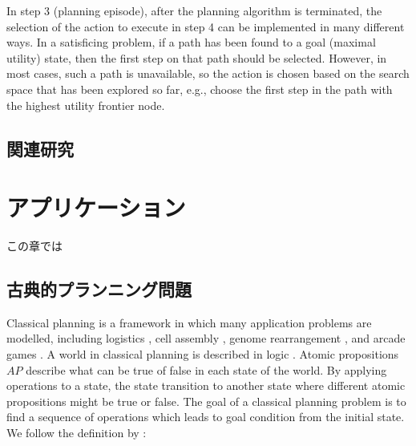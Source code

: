 \documentclass{book}
\begin{document}
In step 3 (planning episode), after the planning algorithm is terminated, the selection of the action to execute in step 4 can be implemented in many different ways.
In a satisficing problem, if a path has been found to a goal (maximal utility) state, then the first step on that path should be selected. However, in most cases, such a path is unavailable, so the action is chosen based on the search space that has been explored so far, e.g., choose the first step in the path with the highest utility frontier node.

\section{関連研究}


\begin{comment}
\chapter{ヒューリスティック関数}
\section{ドメイン固有のヒューリスティック}
\section{緩和問題}
\end{comment}

\chapter{アプリケーション}

この章では

\section{古典的プランニング問題}

Classical planning is a framework in which many application problems are modelled, including logistics \cite{helmert2010scanalyzer,sousa2013toward}, cell assembly \cite{asai2014fully}, genome rearrangement \cite{erdem2005genome}, and arcade games \cite{Lipovetzky2015a,jinnai2017learning}.
A world in classical planning is described in logic \cite{fikes:71}. Atomic propositions $AP$ describe what can be true of false in each state of the world. By applying operations to a state, the state transition to another state where different atomic propositions might be true or false. The goal of a classical planning problem is to find a sequence of operations which leads to goal condition from the initial state.
We follow the definition by \cite{edelkamp:2010:hst:1875144}:
\end{document}
